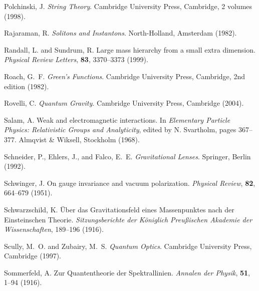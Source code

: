 \documentclass[12pt,a4paper]{article}
\begin{document}
\begin{thebibliography}{99}
		Polchinski, J.
		\newblock \textit{String Theory}.
		\newblock Cambridge University Press, Cambridge, 2 volumes (1998).
		
		Rajaraman, R.
		\newblock \textit{Solitons and Instantons}.
		\newblock North-Holland, Amsterdam (1982).
		
		Randall, L. and Sundrum, R.
		\newblock Large mass hierarchy from a small extra dimension.
		\newblock \textit{Physical Review Letters}, \textbf{83}, 3370--3373 (1999).
		\newblock {}
		
		Roach, G.~F.
		\newblock \textit{Green's Functions}.
		\newblock Cambridge University Press, Cambridge, 2nd edition (1982).
		
		Rovelli, C.
		\newblock \textit{Quantum Gravity}.
		\newblock Cambridge University Press, Cambridge (2004).
		
		Salam, A.
		\newblock Weak and electromagnetic interactions.
		\newblock In \textit{Elementary Particle Physics: Relativistic Groups and Analyticity}, edited by N. Svartholm, pages 367--377. Almqvist \& Wiksell, Stockholm (1968).
		
		Schneider, P., Ehlers, J., and Falco, E.~E.
		\newblock \textit{Gravitational Lenses}.
		\newblock Springer, Berlin (1992).
		
		Schwinger, J.
		\newblock On gauge invariance and vacuum polarization.
		\newblock \textit{Physical Review}, \textbf{82}, 664--679 (1951).
		\newblock {}
		
		Schwarzschild, K.
		\newblock Über das Gravitationsfeld eines Massenpunktes nach der Einsteinschen Theorie.
		\newblock \textit{Sitzungsberichte der Königlich Preußischen Akademie der Wissenschaften}, 189--196 (1916).
		
		Scully, M.~O. and Zubairy, M.~S.
		\newblock \textit{Quantum Optics}.
		\newblock Cambridge University Press, Cambridge (1997).
		
		Sommerfeld, A.
		\newblock Zur Quantentheorie der Spektrallinien.
		\newblock \textit{Annalen der Physik}, \textbf{51}, 1--94 (1916).
		\newblock {}
		

\end{thebibliography}
\end{document}
